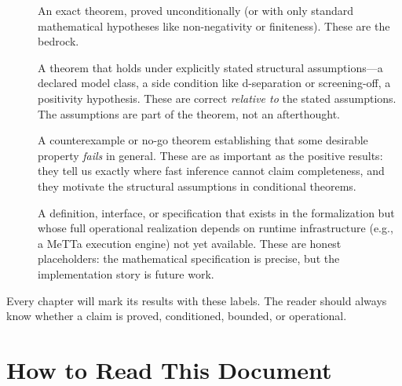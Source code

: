 \documentclass[11pt,openany]{report}
\begin{document}
\begin{description}
\item[\claimCore{}] An exact theorem, proved unconditionally (or with only
  standard mathematical hypotheses like non-negativity or finiteness).
  These are the bedrock.

\item[\claimConditional{}] A theorem that holds under explicitly stated
  structural assumptions---a declared model class, a side condition like
  d-separation or screening-off, a positivity hypothesis.  These are correct
  \emph{relative to} the stated assumptions.  The assumptions are part of the
  theorem, not an afterthought.

\item[\claimBoundary{}] A counterexample or no-go theorem establishing that
  some desirable property \emph{fails} in general.  These are as important as
  the positive results: they tell us exactly where fast inference cannot claim
  completeness, and they motivate the structural assumptions in conditional
  theorems.

\item[\claimOperational{}] A definition, interface, or specification that
  exists in the formalization but whose full operational realization depends
  on runtime infrastructure (e.g., a MeTTa execution engine) not yet
  available.  These are honest placeholders: the mathematical specification
  is precise, but the implementation story is future work.
\end{description}

Every chapter will mark its results with these labels.  The reader should
always know whether a claim is proved, conditioned, bounded, or operational.

\section{How to Read This Document}
\end{document}
